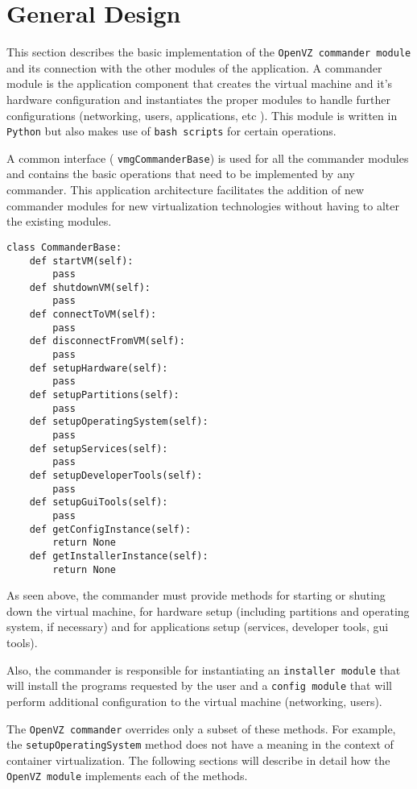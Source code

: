 \section{General Design} \label{sec:openvz-design}
This section describes the basic implementation of the \texttt{OpenVZ 
commander module} and its connection with the other modules of the 
application. A commander module is the application component 
that creates the virtual machine and it's hardware configuration and 
instantiates the proper modules to handle further configurations (networking, 
users, applications, etc ). This module is written in \texttt{Python} but 
also makes use of \texttt{bash scripts} for certain operations. 

A common interface ( \texttt{vmgCommanderBase}) is used for all the 
commander modules and contains the basic operations that need to be 
implemented by any commander. This application architecture facilitates 
the addition of new commander modules for new virtualization technologies 
without having to alter the existing modules. 
\\
\lstset{language=Python,caption=Commander module interface,
label=lst:if-commander}
\begin{lstlisting}
class CommanderBase:
	def startVM(self):
		pass
	def shutdownVM(self):
		pass
	def connectToVM(self):
		pass
	def disconnectFromVM(self):
		pass		
	def setupHardware(self):
		pass
	def setupPartitions(self):
		pass
	def setupOperatingSystem(self):
		pass
	def setupServices(self):
		pass
	def setupDeveloperTools(self):
		pass
	def setupGuiTools(self):
		pass	
	def getConfigInstance(self):
		return None
	def getInstallerInstance(self):
		return None
\end{lstlisting}

As seen above, the commander must provide methods for starting or 
shuting down the virtual machine, for hardware setup (including partitions 
and operating system, if necessary) and for applications setup (services, 
developer tools, gui tools).

Also, the commander is responsible 
for instantiating an \texttt{installer module} that will install the programs 
requested by the user and a \texttt{config module} that will perform 
additional configuration to the virtual machine (networking, users).

The \texttt{OpenVZ commander} overrides only a subset of these 
methods. For example, the \texttt{setupOperatingSystem} method 
does not have a meaning in the context of container virtualization. 
The following sections will describe in detail how the \texttt{OpenVZ 
module} implements each of the methods.

